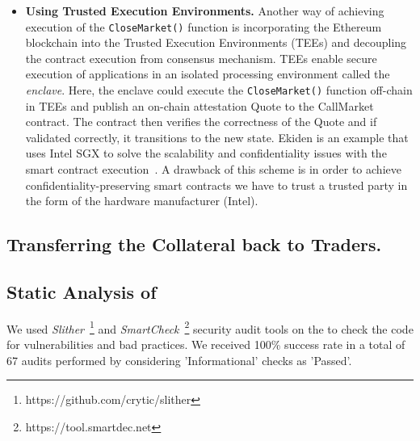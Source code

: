 \begin{itemize}
\begin{itemize}
\item \textbf{{Using Trusted Execution Environments.}} Another way of achieving execution of the \texttt{CloseMarket()} function is incorporating the Ethereum blockchain into the Trusted Execution Environments (TEEs) and decoupling the contract execution from consensus mechanism. TEEs enable secure execution of applications in an isolated processing environment called the \textit{enclave}. Here, the enclave could execute the \texttt{CloseMarket()} function off-chain in TEEs and publish an on-chain attestation Quote to the CallMarket contract. The contract then verifies the correctness of the Quote and if validated correctly, it transitions to the new state. Ekiden is an example that uses Intel SGX to solve the scalability and confidentiality issues with the smart contract execution~\cite{cheng2019ekiden}. A drawback of this scheme is in order to achieve confidentiality-preserving smart contracts we have to trust a trusted party in the form of the hardware manufacturer (\eg Intel).


\end{itemize}
\end{itemize}

\subsection{Transferring the Collateral back to Traders.}


\subsection*{Static Analysis of \cm}
We used \textit{Slither}~\footnote{https://github.com/crytic/slither} and \textit{SmartCheck}~\footnote{https://tool.smartdec.net} security audit tools on the \cm to check the code  for vulnerabilities and bad practices. We received 100\% success rate in a total of 67 audits performed by considering 'Informational' checks as 'Passed'.





